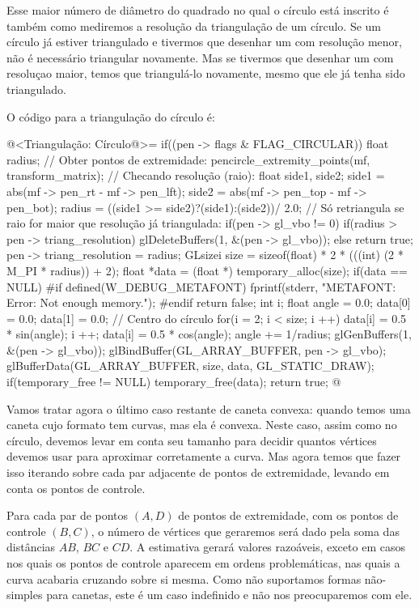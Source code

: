 {Esse maior número de diâmetro do quadrado no qual o círculo está
inscrito é também como mediremos a resolução da triangulação de um
círculo. Se um círculo já estiver triangulado e tivermos que desenhar
um com resolução menor, não é necessário triangular novamente. Mas se
tivermos que desenhar um com resoluçao maior, temos que triangulá-lo
novamente, mesmo que ele já tenha sido triangulado.

O código para a triangulação do círculo é:

\iniciocodigo
@<Triangulação: Círculo@>=
if((pen -> flags & FLAG_CIRCULAR)){
  float radius;
  // Obter pontos de extremidade:
  pencircle_extremity_points(mf, transform_matrix);
  // Checando resolução (raio):
  {
    float side1, side2;
    side1 = abs(mf -> pen_rt - mf -> pen_lft);
    side2 = abs(mf -> pen_top - mf -> pen_bot);
    radius = ((side1 >= side2)?(side1):(side2))/ 2.0;
  }
  // Só retriangula se raio for maior que resolução já triangulada:
  if(pen -> gl_vbo != 0){
    if(radius > pen -> triang_resolution)
      glDeleteBuffers(1, &(pen -> gl_vbo));
    else
      return true;
  }
  pen -> triang_resolution = radius;
  GLsizei size = sizeof(float) * 2 * (((int) (2 * M_PI * radius)) + 2);
  float *data = (float *) temporary_alloc(size);
  if(data == NULL){
#if defined(W_DEBUG_METAFONT)
    fprintf(stderr, "METAFONT: Error: Not enough memory.\n");
#endif
    return false;
  }
  {
    int i;
    float angle = 0.0;
    data[0] = 0.0;
    data[1] = 0.0; // Centro do círculo
    for(i = 2; i < size; i ++){
      data[i] = 0.5 * sin(angle);
      i ++;
      data[i] = 0.5 * cos(angle);
      angle += 1/radius;
    }
  }
  glGenBuffers(1, &(pen -> gl_vbo));
  glBindBuffer(GL_ARRAY_BUFFER, pen -> gl_vbo);
  glBufferData(GL_ARRAY_BUFFER, size, data, GL_STATIC_DRAW);
  if(temporary_free != NULL)
    temporary_free(data);
  return true;
}
@
\fimcodigo

Vamos tratar agora o último caso restante de caneta convexa: quando
temos uma caneta cujo formato tem curvas, mas ela é convexa. Neste
caso, assim como no círculo, devemos levar em conta seu tamanho para
decidir quantos vértices devemos usar para aproximar corretamente a
curva. Mas agora temos que fazer isso iterando sobre cada par
adjacente de pontos de extremidade, levando em conta os pontos de
controle.

Para cada par de pontos $(A, D)$ de pontos de extremidade, com os
pontos de controle $(B, C)$, o número de vértices que geraremos será
dado pela soma das distâncias $AB$, $BC$ e $CD$. A estimativa gerará
valores razoáveis, exceto em casos nos quais os pontos de controle
aparecem em ordens problemáticas, nas quais a curva acabaria cruzando
sobre si mesma. Como não suportamos formas não-simples para canetas,
este é um caso indefinido e não nos preocuparemos com ele.

}
